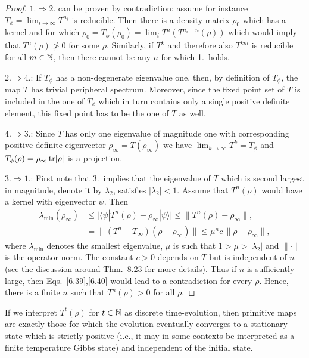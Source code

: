\documentclass[11pt,a4paper]{article}
\theoremstyle{plain}
\theoremstyle{definition}
\theoremstyle{remark}
\begin{document}
\begin{proof}
    $1.\Rightarrow 2$. can be proven by contradiction: assume for instance
    $T_\phi=\lim_{i\to\infty}T^{n_i}$ is reducible. Then there is a density matrix
    $\rho_0$ which has a kernel and for which
    $\rho_0=T_\phi(\rho_0)=\lim_i T^n\!(T^{n_i-n}(\rho))$ which would imply
    that $T^n(\rho)\not>0$ for some $\rho$. Similarly, if $T^k$ and therefore also
    $T^{km}$ is reducible for all $m\in\mathbb{N}$, then there cannot be any $n$ for which
    1.\ holds.

    $2.\Rightarrow 4$.: If $T_\phi$ has a non-degenerate eigenvalue one, then, by
    definition of $T_\phi$, the map $T$ has trivial peripheral spectrum. Moreover,
    since the fixed point set of $T$ is included in the one of $T_\phi$ which in
    turn contains only a single positive definite element, this fixed point has to
    be the one of $T$ as well.

    $4.\Rightarrow 3$.: Since $T$ has only one eigenvalue of magnitude one with
    corresponding positive definite eigenvector $\rho_\infty=T(\rho_\infty)$ we have
    $\lim_{k\to\infty}T^k=T_\phi$ and $T_\phi(\rho)=\rho_\infty \operatorname{tr}[\rho]$ is a
    projection.

    $3.\Rightarrow 1$.: First note that 3.\ implies that the eigenvalue of $T$ which
    is second largest in magnitude, denote it by $\lambda_2$, satisfies
    $|\lambda_2|<1$. Assume that $T^n(\rho)$ would have a kernel with eigenvector
    $\psi$. Then
    \begin{align}
        \lambda_{\min}(\rho_\infty)
         &\le \bigl|\langle\psi|T^n(\rho)-\rho_\infty|\psi\rangle\bigr|
        \le \lVert T^n(\rho)-\rho_\infty\rVert, \tag{6.39}\\
         &= \lVert (T^n-T_\infty)(\rho-\rho_\infty)\rVert
        \le \mu^n c\,\lVert\rho-\rho_\infty\rVert, \tag{6.40}
    \end{align}
    where $\lambda_{\min}$ denotes the smallest eigenvalue, $\mu$ is such that
    $1>\mu>|\lambda_2|$ and $\lVert\cdot\rVert$ is the operator norm. The constant
    $c>0$ depends on $T$ but is independent of $n$ (see the discussion around
    Thm.~8.23 for more details). Thus if $n$ is sufficiently large, then
    Eqs.~\eqref{6.39},\eqref{6.40} would lead to a contradiction for every $\rho$.
    Hence, there is a finite $n$ such that $T^n(\rho)>0$ for all $\rho$.
\end{proof}

If we interpret $T^t(\rho)$ for $t\in\mathbb{N}$ as discrete time-evolution, then
primitive maps are exactly those for which the evolution eventually converges to
a stationary state which is strictly positive (i.e., it may in some contexts be
interpreted as a finite temperature Gibbs state) and independent of the initial
state.
\end{document}

